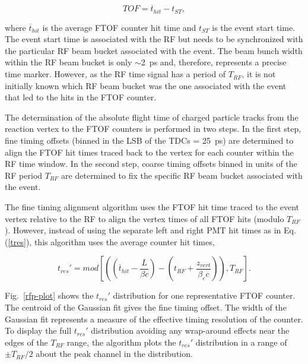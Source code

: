 \documentclass{elsart}
\begin{document}
\begin{equation}
TOF = \overline{t}_{hit} - t_{ST},
\end{equation}

\noindent
where $\overline{t}_{hit}$ is the average FTOF counter hit time and $t_{ST}$ is the event start time.
The event start time is associated with the RF but needs to be synchronized with the particular RF
beam bucket associated with the event. The beam bunch width within the RF beam bucket is only
$\sim$2~ps and, therefore, represents a precise time marker. However, as the RF time signal has a
period of $T_{RF}$, it is not initially known which RF beam bucket was the one associated with the
event that led to the hits in the FTOF counter.

The determination of the absolute flight time of charged particle tracks from the reaction vertex
to the FTOF counters is performed in two steps. In the first step, fine timing offsets (binned in the
LSB of the TDCs = 25~ps) are determined to align the FTOF hit times traced back to the vertex for
each counter within the RF time window. In the second step, coarse timing offsets binned in units of the
RF period $T_{RF}$ are determined to fix the specific RF beam bucket associated with the event.

The fine timing alignment algorithm uses the FTOF hit time traced to the event vertex relative to the RF
to align the vertex times of all FTOF hits (modulo $T_{RF}$). However, instead of using the separate
left and right PMT hit times as in Eq.(\ref{tres}), this algorithm uses the average counter hit times, 

\begin{equation}
t_{res}' = mod \left[ \left( \left(\overline{t}_{hit} - \frac{L}{\beta c} \right) -
\left(t_{RF} + \frac{z_{vert}}{\beta_e c} \right) \right), T_{RF} \right].
\end{equation}

Fig.~\ref{rfp-plot} shows the $t_{res}'$ distribution for one representative FTOF counter. The centroid
of the Gaussian fit gives the fine timing offset. The width of the Gaussian fit represents a measure of the
effective timing resolution of the counter. To display the full $t_{res}'$ distribution avoiding any
wrap-around effects near the edges of the $T_{RF}$ range, the algorithm plots the $t_{res}'$ distribution
in a range of $\pm T_{RF}/2$ about the peak channel in the distribution.
\end{document}
